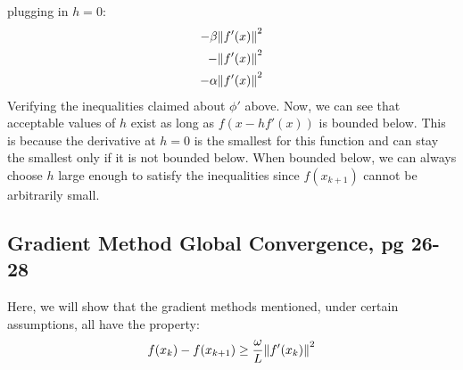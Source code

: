 \documentclass[12pt,a4paper]{article}
\begin{document}
	plugging in $h=0$:
	\begin{align*}
		-\beta \norm{f'(x)}^2 \\
		-\norm{f'(x)}^2 \\
		-\alpha \norm{f'(x)}^2
	\end{align*}
	Verifying the inequalities claimed about $\phi'$ above. Now, we can see that acceptable values of $h$ exist as long as $f(x - hf'(x)) $ is bounded below. This is because the derivative at $h=0$ is the smallest for this function and can stay the smallest only if it is not bounded below. When bounded below, we can always choose $h$ large enough to satisfy the inequalities since $f(x_{k+1})$ cannot be arbitrarily small. 
	
	\subsection*{Gradient Method Global Convergence, pg 26-28}\label{gradGlobConv}
	Here, we will show that the gradient methods mentioned, under certain assumptions, all have the property:
	\begin{align*}
		f(x_k) - f(x_{k+1}) \geq \frac{\omega}{L}\norm{f'(x_k)}^2
	\end{align*}
	
\end{document}
